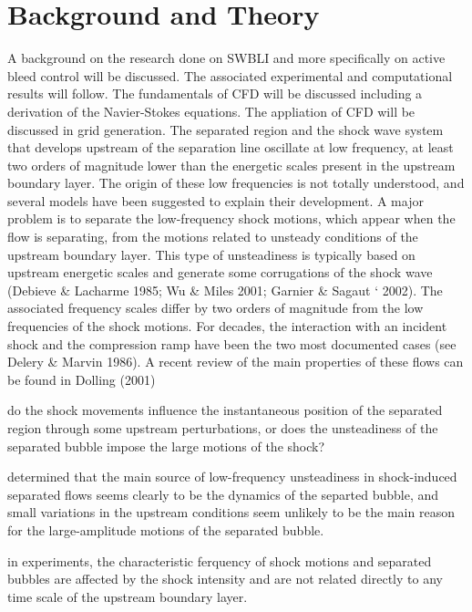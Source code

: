 
\chapter{Background and Theory} \label{background and theory}

A background on the research done on SWBLI and more specifically on active bleed control will be discussed. The associated experimental and computational results will follow. The fundamentals of CFD will be discussed including a derivation of the Navier-Stokes equations. The appliation of CFD will be discussed in grid generation.
The separated region and the shock wave system that develops upstream of the separation line oscillate at low frequency, at least two orders of magnitude lower than the energetic scales present in the upstream boundary layer. The origin of these low frequencies is not totally understood, and several models have been suggested to explain their development. A major problem is to separate the low-frequency shock motions, which appear when the flow is separating, from the motions related to unsteady conditions of the upstream boundary layer. This type of unsteadiness is typically based on upstream energetic scales and generate some corrugations of the shock wave (Debieve \& Lacharme 1985; Wu \& Miles 2001; Garnier \& Sagaut ` 2002). The associated frequency scales differ by two orders of magnitude from the low frequencies of the shock motions. \cite{Piponniau2009}
For decades, the interaction with an incident shock and the compression ramp have been the two most documented cases (see Delery \& Marvin 1986). A recent review of the main properties of these flows can be found in Dolling (2001) \cite{Piponniau2009}

do the shock
movements influence the instantaneous position of the separated region through some
upstream perturbations, or does the unsteadiness of the separated bubble impose the
large motions of the shock?

determined that the main source of low-frequency unsteadiness in shock-induced separated flows seems clearly to be the dynamics of the separted bubble, and small variations in the upstream conditions seem unlikely to be the main reason for the large-amplitude motions of the separated bubble. 

in experiments, the characteristic ferquency of shock motions and separated bubbles are affected by the shock intensity and are not related directly to any time scale of the upstream boundary layer.

